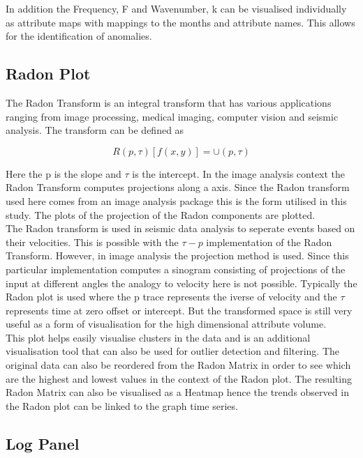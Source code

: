 In addition the Frequency, F and Wavenumber, k can be visualised individually as attribute maps with mappings to the months and attribute names. This allows for the identification of anomalies. 

\subsection{Radon Plot}

The Radon Transform is an integral transform that has various applications ranging from image processing, medical imaging, computer vision and seismic analysis. The transform can be defined as 

\begin{equation}
      R(p,\tau)[f(x,y)] = \cup(p, \tau)
\end{equation}

Here the p is the slope and $\tau$ is the intercept. In the image analysis context the Radon Transform computes projections along a axis. Since the Radon transform used here comes from an image analysis package this is the form utilised in this study. The plots of the projection of the Radon components are plotted. \\

The Radon transform is used in seismic data analysis to seperate events based on their velocities. This is possible with the $\tau-p$ implementation of the Radon Transform. However, in image analysis the projection method is used. Since this particular implementation computes a sinogram consisting of projections of the input at different angles the analogy to velocity here is not possible. Typically the Radon plot is used where the p trace represents the iverse of velocity and the $\tau$ represents time at zero offset or intercept. But the transformed space is still very useful as a form of visualisation for the high dimensional attribute volume.  \\

This plot helps easily visualise clusters in the data and is an additional visualisation tool that can also be used for outlier detection and filtering. The original data can also be reordered from the Radon Matrix in order to see which are the highest and lowest values in the context of the Radon plot. The resulting Radon Matrix can also be visualised as a Heatmap hence the trends observed in the Radon plot can be linked to the graph time series.

\subsection{Log Panel}


